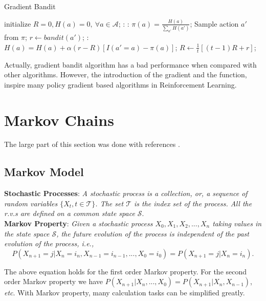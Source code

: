 \documentclass{progartcn}
\begin{document}
        	\begin{algorithm}[H]
			\caption{Gradient Bandit}
			\label{alg: gb}
			\begin{algorithmic}[1]
				\State initialize $R=0, H(a)=0,\ \forall a\in\mathcal{A}$;
				:
				:
					\State $\pi(a) = \frac{H(a)}{\sum_{a'} H(a')}$;
				\EndFor
				\State Sample action $a'$ from $\pi$;
				\State $r\gets bandit(a')$;
				:
					\State $H(a) = H(a) + \alpha(r-R)[I(a'=a)-\pi(a)]$;
					\State $R\gets \frac{1}{t}[(t-1)R+r]$;
            	\EndFor
            	\EndFor
			\end{algorithmic}
			\end{algorithm}

        	Actually, gradient bandit algorithm has a bad performance when compared with other algorithms. However, the introduction of the gradient and the function, inspire many policy gradient based algorithms in Reinforcement Learning.

        	\pagebreak

\pagebreak

\section{Markov Chains}

	The large part of this section was done with references \cite{si252,HB,robert2013monte}.\\

	\subsection{Markov Model}

			\textbf{Stochastic Processes}: \textit{A stochastic process is a collection, or, a sequence of random variables $\{X_t,t\in \mathcal{T}\}$. The set $\mathcal{T}$ is the index set of the process. All the \textit{r.v.}s are defined on a common state space $\mathcal{S}$}.\\
			
			\textbf{Markov Property}: \textit{Given a stochastic process $X_0, X_1, X_2, ..., X_n$ taking values in the state space $\mathcal{S}$, the future evolution of the process is independent of the past evolution of the process, i.e.,}
			\[P(X_{n+1}=j|X_n=i_n,X_{n-1}=i_{n-1},...,X_0=i_0)=P(X_{n+1}=j|X_n=i_n).\]

			The above equation holds for the first order Markov property. For the second order Markov property we have $P(X_{n+1}|X_n, ...,X_0)=P(X_{n+1}|X_n,X_{n-1})$, \textit{etc}. With Markov property, many calculation tasks can be simplified greatly.\\
		
\end{document}
